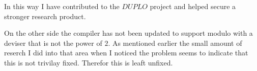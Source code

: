 In this way I have contributed to the $DUPLO$ project and helped secure a stronger research product.

On the other side the compiler has not been updated to support modulo with a deviser that is not the power of $2$. As mentioned earlier the small amount of reserch I did into that area when I noticed the problem seems to indicate that this is not trivilay fixed. Therefor this is leaft unfixed.


